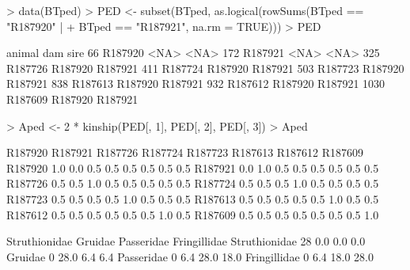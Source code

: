 \documentclass{article}
\begin{document}
\begin{Schunk}
\begin{Sinput}
> data(BTped)
> PED <- subset(BTped, as.logical(rowSums(BTped == "R187920" | 
+     BTped == "R187921", na.rm = TRUE)))
> PED
\end{Sinput}
\begin{Soutput}
      animal     dam    sire
66   R187920    <NA>    <NA>
172  R187921    <NA>    <NA>
325  R187726 R187920 R187921
411  R187724 R187920 R187921
503  R187723 R187920 R187921
838  R187613 R187920 R187921
932  R187612 R187920 R187921
1030 R187609 R187920 R187921
\end{Soutput}
\begin{Sinput}
> Aped <- 2 * kinship(PED[, 1], PED[, 2], PED[, 3])
> Aped
\end{Sinput}
\begin{Soutput}
        R187920 R187921 R187726 R187724 R187723 R187613 R187612 R187609
R187920     1.0     0.0     0.5     0.5     0.5     0.5     0.5     0.5
R187921     0.0     1.0     0.5     0.5     0.5     0.5     0.5     0.5
R187726     0.5     0.5     1.0     0.5     0.5     0.5     0.5     0.5
R187724     0.5     0.5     0.5     1.0     0.5     0.5     0.5     0.5
R187723     0.5     0.5     0.5     0.5     1.0     0.5     0.5     0.5
R187613     0.5     0.5     0.5     0.5     0.5     1.0     0.5     0.5
R187612     0.5     0.5     0.5     0.5     0.5     0.5     1.0     0.5
R187609     0.5     0.5     0.5     0.5     0.5     0.5     0.5     1.0
\end{Soutput}
\end{Schunk}

\begin{Schunk}
\begin{Soutput}
              Struthionidae Gruidae Passeridae Fringillidae
Struthionidae            28     0.0        0.0          0.0
Gruidae                   0    28.0        6.4          6.4
Passeridae                0     6.4       28.0         18.0
Fringillidae              0     6.4       18.0         28.0
\end{Soutput}
\end{Schunk}
\end{document}
